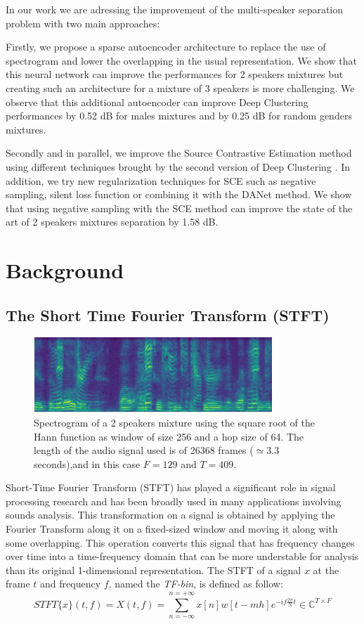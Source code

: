 \documentclass[master, tikz, final,11pt, dvipdfmx]{iscs-thesis}
\begin{document}
In our work we are adressing the improvement of the multi-speaker separation problem with two main approaches:

Firstly, we propose a sparse autoencoder architecture to replace the use of spectrogram and lower the overlapping in the usual representation. We show that this neural network can improve the performances for 2 speakers mixtures but creating such an architecture for a mixture of 3 speakers is more challenging. We observe that this additional autoencoder can improve Deep Clustering performances by 0.52 dB for males mixtures and by 0.25 dB for random genders mixtures.

Secondly and in parallel, we improve the Source Contrastive Estimation method using different techniques brought by the second version of Deep Clustering \cite{DPCLV2}. In addition, we try new regularization techniques for SCE such as negative sampling, silent loss function or combining it with the DANet \cite{DANet} method. We show that using negative sampling with the SCE method can improve the state of the art of 2 speakers mixtures separation by 1.58 dB.

\chapter{Background}
\section{The Short Time Fourier Transform (STFT)}

\begin{figure}[b]
\centering
\includegraphics[width=0.8\textwidth]{xmix}
\caption[Spectrogram of a 2 speaker mixture]{Spectrogram of a 2 speakers mixture using the square root of the Hann function as window of size 256 and a hop size of 64. The length of the audio signal used is of 26368 frames ($\simeq 3.3$ seconds),and in this case $F = 129$ and $T = 409$.}
\label{fig:spectrogram} 
\end{figure}


Short-Time Fourier Transform (STFT) has played a significant role in signal processing research and has been broadly used in many applications involving sounds analysis.
This transformation on a signal is obtained by applying the Fourier Transform along it on a fixed-sized window and moving it along with some overlapping. This operation converts this signal that has frequency changes over time into a time-frequency domain that can be more understable for analysis than its original 1-dimensional representation.
The STFT of a signal $x$ at the frame $t$ and frequency $f$, named the \textit{TF-bin}, is defined as follow:
\[
	STFT\{x\}(t,f) = X(t,f) = \sum_{n=-\infty}^{n=+\infty}x[n]w[t-mh]e^{-if\frac{2\pi}{N}t } \in \mathbb{C}^{T\times F}
\]
\end{document}
